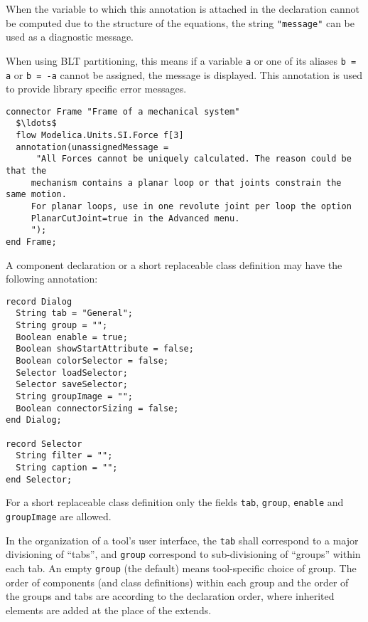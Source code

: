 When the variable to which this annotation is attached in the declaration cannot be computed due to the structure of the equations, the string \lstinline!"message"! can be used as a diagnostic message.

\begin{nonnormative}
When using BLT partitioning, this means if a variable \lstinline!a! or one of its aliases \lstinline!b = a! or \lstinline!b = -a!
cannot be assigned, the message is displayed.  This annotation is used to provide library specific error messages.
\end{nonnormative}

\begin{example}
\begin{lstlisting}[language=modelica]
connector Frame "Frame of a mechanical system"
  $\ldots$
  flow Modelica.Units.SI.Force f[3]
  annotation(unassignedMessage =
      "All Forces cannot be uniquely calculated. The reason could be that the
     mechanism contains a planar loop or that joints constrain the same motion.
     For planar loops, use in one revolute joint per loop the option
     PlanarCutJoint=true in the Advanced menu.
     ");
end Frame;
\end{lstlisting}
\end{example}

A component declaration or a short replaceable class definition may have the following annotation:
\begin{lstlisting}[language=modelica]
record Dialog
  String tab = "General";
  String group = "";
  Boolean enable = true;
  Boolean showStartAttribute = false;
  Boolean colorSelector = false;
  Selector loadSelector;
  Selector saveSelector;
  String groupImage = "";
  Boolean connectorSizing = false;
end Dialog;

record Selector
  String filter = "";
  String caption = "";
end Selector;
\end{lstlisting}%

For a short replaceable class definition only the fields \lstinline!tab!, \lstinline!group!, \lstinline!enable! and \lstinline!groupImage! are allowed.

In the organization of a tool's user interface, the \lstinline!tab! shall correspond to a major divisioning of ``tabs'', and \lstinline!group! correspond to sub-divisioning of ``groups'' within each tab.
An empty \lstinline!group! (the default) means tool-specific choice of group.
The order of components (and class definitions) within each group and the order of the groups and tabs are according to the declaration order, where inherited elements are added at the place of the extends.

